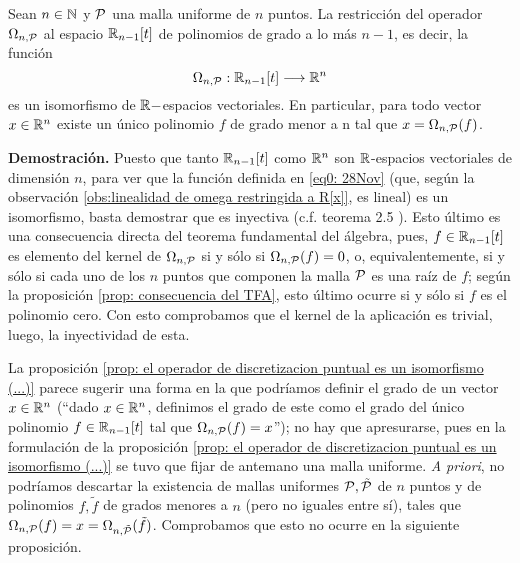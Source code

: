 \begin{prop}
\label{prop: el operador de discretizacion puntual es un isomorfismo (...)}
Sean $n \in \mathbb{N}$ y $\mathcal{P}$ 
una malla uniforme de $n$
puntos. 
La restricción del operador $\Omega_{n, \mathcal{P}}$
al espacio $\mathbb{R}_{n-1}[t]$ de polinomios de grado a lo más
$n-1$, es decir, la función 
\begin{equation}
\label{eq0: 28Nov}
\Omega_{n, \mathcal{P}}:
\mathbb{R}_{n-1}[t] \longrightarrow \mathbb{R}^{n}
\end{equation}
es un isomorfismo de $\mathbb{R}-$espacios vectoriales.
En particular, para todo vector $x \in \mathbb{R}^{n}$
existe un único polinomio $f$ de grado menor a n
tal que $x = \Omega_{n, \mathcal{P}}(f)$.
\end{prop}
\noindent
\textbf{Demostración.}
Puesto que tanto $\mathbb{R}_{n-1}[t]$
como $\mathbb{R}^{n}$ son $\mathbb{R}$-espacios vectoriales
de dimensión $n$, para ver que la función 
definida en
\eqref{eq0: 28Nov} (que, según la observación 
\ref{obs:linealidad de omega restringida a R[x]}, es lineal)
es un isomorfismo, basta
demostrar que es inyectiva 
(c.f. teorema 2.5 \cite{friedberg}).
Esto último es una consecuencia directa del 
teorema fundamental del álgebra,
pues, 
$f \in \mathbb{R}_{n-1}[t]$
es elemento del kernel
de $\Omega_{n, \mathcal{P}}$ si y sólo si 
$\Omega_{n, \mathcal{P}}(f)=0$, o, equivalentemente,
si y sólo si 
cada uno de los $n$ puntos que componen la
malla $\mathcal{P}$ es una raíz de $f$;
según la proposición
\ref{prop: consecuencia del TFA},
esto último ocurre si y sólo si $f$ es el polinomio cero.
Con esto comprobamos que el kernel de la aplicación
\label{eq1: 25Nov} es trivial, luego, la inyectividad
de esta.
\QEDB
\vspace{0.2cm}

La proposición
\ref{prop: el operador de discretizacion puntual es un isomorfismo (...)}
parece sugerir 
una forma en la que podríamos 
definir el grado de 
un vector $x \in \mathbb{R}^{n}$ (``dado $x \in \mathbb{R}^{n}$, definimos
el grado de este como el grado del único polinomio $f \in \mathbb{R}_{n-1}[t]$
tal que $\Omega_{n, \mathcal{P}}(f)=x$''); no hay
que apresurarse, pues en la formulación de
la proposición
\ref{prop: el operador de discretizacion puntual es un isomorfismo (...)}
se tuvo que fijar de antemano una malla uniforme.
\textit{A priori}, no podríamos descartar 
la existencia de mallas uniformes
$\mathcal{P}, \tilde{\mathcal{P}}$ 
de $n$ puntos
y de polinomios
$f, \tilde{f}$ de grados menores a $n$ (pero no 
iguales entre sí), tales que
$\Omega_{n, \mathcal{P}}(f) = x = \Omega_{n, \tilde{\mathcal{P}}}(\tilde{f})$.
Comprobamos que esto no ocurre
en la siguiente proposición.



